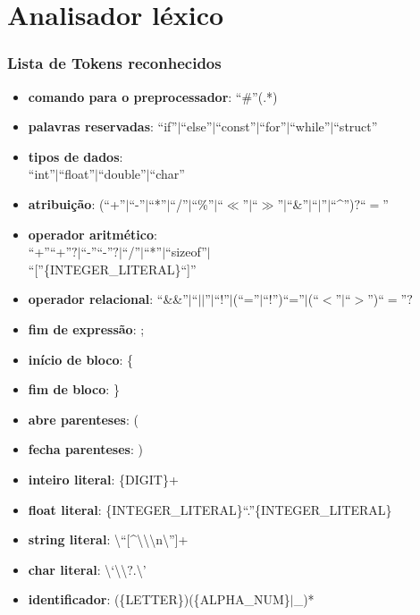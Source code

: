 \documentclass[12pt]{beamer}
\begin{document}
\section[Analisador]{Analisador léxico}\label{Analisádor léxico}
\begin{frame}[allowframebreaks]
    \frametitle{Lista de Tokens reconhecidos}
    \begin{itemize}
        \item\textbf{comando para o preprocessador}: ``\#''(.*)
        \item\textbf{palavras reservadas}: ``if''$|$``else''$|$``const''$|$``for''$|$``while''$|$``struct''
        \item\textbf{tipos de dados}:\\``int''$|$``float''$|$``double''$|$``char''
        \item\textbf{atribuição}: (``+''$|$``-''$|$``*''$|$``/''$|$``\%''$|$``$\ll$''$|$``$\gg$''$|$``\&''$|$``$|$''$|$``^'')$?$``$=$''
        \item\textbf{operador aritmético}:\\``+''``+''$?|$``-''``-''$?|$``/''$|$``*''$|$``sizeof''$|$\\``[''\{{\small INTEGER\_LITERAL}\}``]''
        \item\textbf{operador relacional}: ``\&\&''$|$``$||$''$|$``!''$|$(``=''$|$``!'')``=''$|$(``$<$''$|$``$>$'')``$=$''$?$
        \framebreak
        \item\textbf{fim de expressão}: ;
        \item\textbf{início de bloco}: \{
        \item\textbf{fim de bloco}: \}
        \item\textbf{abre parenteses}: (
        \item\textbf{fecha parenteses}: )
        \item\textbf{inteiro literal}: \{{\small DIGIT}\}+
        \item\textbf{float literal}: \{{\small INTEGER\_LITERAL}\}``.''\{{\small INTEGER\_LITERAL}\}
        \item\textbf{string literal}: \textbackslash{}``[\^{}\textbackslash{}\textbackslash{}\textbackslash{}n\textbackslash{}'']+
        \item\textbf{char literal}: \textbackslash{}`\textbackslash{}\textbackslash{}$?$.\textbackslash{}'
        \item\textbf{identificador}: (\{{\small LETTER}\})(\{{\small ALPHA\_NUM}\}$|$\_)*
    \end{itemize}
\end{frame}
\end{document}
